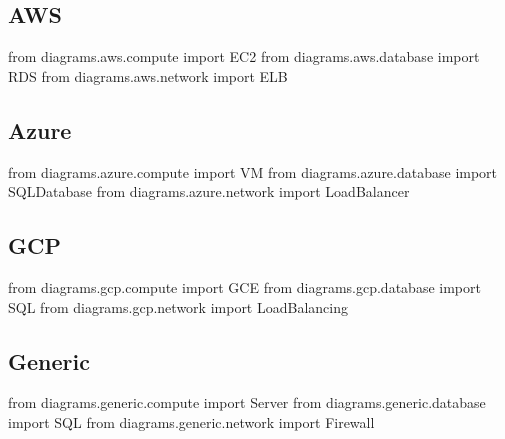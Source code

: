 \documentclass[
  letterpaper,
  DIV=11,
  numbers=noendperiod]{scrreprt}
\newenvironment{Shaded}{\begin{snugshade}}{\end{snugshade}}
\newcommand{\ImportTok}[1]{\textcolor[rgb]{0.00,0.46,0.62}{#1}}
\newcommand{\NormalTok}[1]{\textcolor[rgb]{0.00,0.23,0.31}{#1}}
\begin{document}
\subsection{AWS}\label{aws}

\begin{Shaded}
\begin{Highlighting}[]
\ImportTok{from}\NormalTok{ diagrams.aws.compute }\ImportTok{import}\NormalTok{ EC2}
\ImportTok{from}\NormalTok{ diagrams.aws.database }\ImportTok{import}\NormalTok{ RDS}
\ImportTok{from}\NormalTok{ diagrams.aws.network }\ImportTok{import}\NormalTok{ ELB}
\end{Highlighting}
\end{Shaded}

\subsection{Azure}\label{azure}

\begin{Shaded}
\begin{Highlighting}[]
\ImportTok{from}\NormalTok{ diagrams.azure.compute }\ImportTok{import}\NormalTok{ VM}
\ImportTok{from}\NormalTok{ diagrams.azure.database }\ImportTok{import}\NormalTok{ SQLDatabase}
\ImportTok{from}\NormalTok{ diagrams.azure.network }\ImportTok{import}\NormalTok{ LoadBalancer}
\end{Highlighting}
\end{Shaded}

\subsection{GCP}\label{gcp}

\begin{Shaded}
\begin{Highlighting}[]
\ImportTok{from}\NormalTok{ diagrams.gcp.compute }\ImportTok{import}\NormalTok{ GCE}
\ImportTok{from}\NormalTok{ diagrams.gcp.database }\ImportTok{import}\NormalTok{ SQL}
\ImportTok{from}\NormalTok{ diagrams.gcp.network }\ImportTok{import}\NormalTok{ LoadBalancing}
\end{Highlighting}
\end{Shaded}

\subsection{Generic}\label{generic}

\begin{Shaded}
\begin{Highlighting}[]
\ImportTok{from}\NormalTok{ diagrams.generic.compute }\ImportTok{import}\NormalTok{ Server}
\ImportTok{from}\NormalTok{ diagrams.generic.database }\ImportTok{import}\NormalTok{ SQL}
\ImportTok{from}\NormalTok{ diagrams.generic.network }\ImportTok{import}\NormalTok{ Firewall}
\end{Highlighting}
\end{Shaded}
\end{document}
